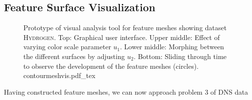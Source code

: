 \subsection{Feature Surface Visualization}
%
\begin{figure}[p]
    \begin{captionbeside}
    {Prototype of visual analysis tool for feature meshes showing dataset
	\textsc{Hydrogen}. Top: Graphical user interface. Upper middle: Effect of
	varying color scale parameter $u_1$. Lower middle: Morphing between the
	different surfaces  by adjusting $u_2$. Bottom: Sliding through time to
	observe the development of the feature meshes (circles).
	}
 	\def\svgwidth{0.6\linewidth}
		{contourmeshvis.pdf_tex}
    \end{captionbeside}
	\label{fig_contourmeshvis}
\end{figure}
%
Having constructed feature meshes, we can now approach problem 3 of DNS data
